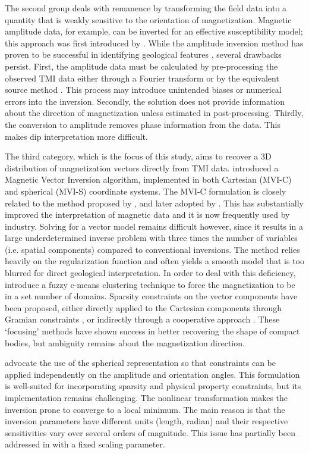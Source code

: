 \documentclass[paper]{geophysics}
\begin{document}
The second group deals with remanence by transforming the field data into a quantity that is weakly sensitive to the orientation of magnetization. Magnetic amplitude data, for example, can be inverted for an effective susceptibility model; this approach was first introduced by \cite[~p.~52]{Shearer05}. While the amplitude inversion method has proven to be successful in identifying geological features \cite[]{Krahenbuhl2007, LiShearer10}, several drawbacks persist. First, the amplitude data must be calculated by pre-processing the observed TMI data either through a Fourier transform or by the equivalent source method \cite[]{LiNabighian14}. This process may introduce unintended biases or numerical errors into the inversion. Secondly, the solution does not provide information about the direction of magnetization unless estimated in post-processing. Thirdly, the conversion to amplitude removes phase information from the data. This makes dip interpretation more difficult.

The third category, which is the focus of this study, aims to recover a 3D distribution of magnetization vectors directly from TMI data. \cite{LelievreOldenburg2009} introduced a Magnetic Vector Inversion algorithm, implemented in both Cartesian (MVI-C) and spherical (MVI-S) coordinate systems.
The MVI-C formulation is closely related to the method proposed by \cite{Kubota2005}, and later adopted by \cite{Ellis2012}. This has substantially improved the interpretation of magnetic data and it is now frequently used by industry.
Solving for a vector model remains difficult however, since it results in a large underdetermined inverse problem with three times the number of variables (i.e. spatial components) compared to conventional inversions. The method relies heavily on the regularization function and often yields a smooth model that is too blurred for direct geological interpretation.
In order to deal with this deficiency, \cite{Li2016} introduce a fuzzy c-means clustering technique to force the magnetization to be in a set number of domains.
Sparsity constraints on the vector components have been proposed, either directly applied to the Cartesian components through Gramian constraints \cite[]{Zhu2015}, or indirectly through a cooperative approach \cite[~p.~101]{Liu2015, Fournier2015}. These `focusing' methods have shown success in better recovering the shape of compact bodies, but ambiguity remains about the magnetization direction.

\cite{LelievreOldenburg2009} advocate the use of the spherical representation so that constraints can be applied independently on the amplitude and orientation angles. This formulation is well-suited for incorporating sparsity and physical property constraints, but its implementation remains challenging. The nonlinear transformation makes the inversion prone to converge to a local minimum. The main reason is that the inversion parameters have different units (length, radian) and their respective sensitivities vary over several orders of magnitude. This issue has partially been addressed in \cite{Liu2017} with a fixed scaling parameter.
\end{document}
